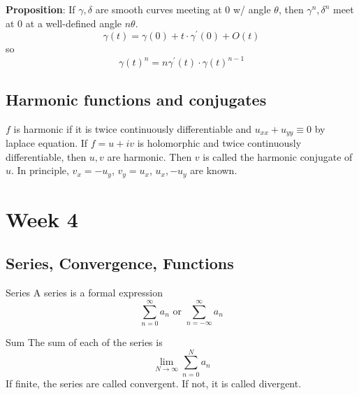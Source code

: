 \documentclass{report}
\begin{document}
\textbf{Proposition}: If $\gamma, \delta$ are smooth curves meeting at $0$ w/ angle $\theta$, then $\gamma^{n}, \delta^{n}$ meet at $0$ at a well-defined angle $n\theta$. 
    \begin{equation*}
        \gamma(t) = \gamma(0) + t\cdot \gamma^{\prime}(0) + O(t)
    \end{equation*}
so
    \begin{equation*}
        \gamma(t)^{n} = n\gamma^{\prime}(t) \cdot \gamma(t)^{n - 1}
    \end{equation*}

\begin{topic}
    \section{Harmonic functions and conjugates}
\end{topic}

$f$ is harmonic if it is twice continuously differentiable and $u_{xx} + u_{yy} \equiv 0$ by laplace equation. If $f = u+ iv$ is holomorphic and twice continuously differentiable, then $u, v$ are harmonic. Then $v$ is called the harmonic conjugate of $u$. In principle, $v_{x} = -u_{y}$, $v_{y} = u_{x}$, $u_{x}, -u_{y}$ are known.


\chapter{Week 4}

\begin{topic}
    \section{Series, Convergence, Functions}
\end{topic}

\begin{definition}{Series}
    A series is a formal expression
        \begin{equation*}
            \sum_{n = 0}^{\infty}a_{n} \text{ or } \sum_{n = -\infty}^{\infty} a_{n}
        \end{equation*}
\end{definition}

\begin{definition}{Sum}
    The sum of each of the series is 
        \begin{equation*}
            \lim\limits_{N \to \infty} \sum_{n = 0}^{N}a_{n}
        \end{equation*}
    If finite, the series are called convergent. If not, it is called divergent.
\end{definition}
\end{document}
